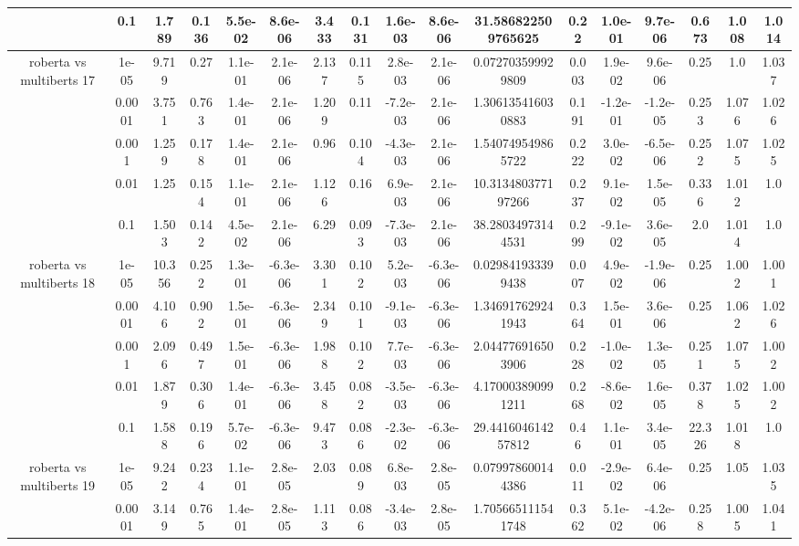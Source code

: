 \begin{tabular}{|c|c|c|c|c|c|c|c|c|c|c|c|c|c|c|c|c|}
 & 0.1 & 1.789 & 0.136 & 5.5e-02 & 8.6e-06 & 3.433 & 0.131 & 1.6e-03 & 8.6e-06 & 31.586822509765625 & 0.22 & 1.0e-01 & 9.7e-06 & 0.673 & 1.008 & 1.014 \\
\hline
\multirow{5}{*}{roberta  vs multiberts 17} & 1e-05 & 9.719 & 0.27 & 1.1e-01 & 2.1e-06 & 2.137 & 0.115 & 2.8e-03 & 2.1e-06 & 0.072703599929809 & 0.003 & 1.9e-02 & 9.6e-06 & 0.25 & 1.0 & 1.037 \\
 & 0.0001 & 3.751 & 0.763 & 1.4e-01 & 2.1e-06 & 1.209 & 0.11 & -7.2e-03 & 2.1e-06 & 1.306135416030883 & 0.191 & -1.2e-01 & -1.2e-05 & 0.253 & 1.076 & 1.026 \\
 & 0.001 & 1.259 & 0.178 & 1.4e-01 & 2.1e-06 & 0.96 & 0.104 & -4.3e-03 & 2.1e-06 & 1.540749549865722 & 0.222 & 3.0e-02 & -6.5e-06 & 0.252 & 1.075 & 1.025 \\
 & 0.01 & 1.25 & 0.154 & 1.1e-01 & 2.1e-06 & 1.126 & 0.16 & 6.9e-03 & 2.1e-06 & 10.313480377197266 & 0.237 & 9.1e-02 & 1.5e-05 & 0.336 & 1.012 & 1.0 \\
 & 0.1 & 1.503 & 0.142 & 4.5e-02 & 2.1e-06 & 6.29 & 0.093 & -7.3e-03 & 2.1e-06 & 38.28034973144531 & 0.299 & -9.1e-02 & 3.6e-05 & 2.0 & 1.014 & 1.0 \\
\hline
\multirow{5}{*}{roberta  vs multiberts 18} & 1e-05 & 10.356 & 0.252 & 1.3e-01 & -6.3e-06 & 3.301 & 0.102 & 5.2e-03 & -6.3e-06 & 0.029841933399438 & 0.007 & 4.9e-02 & -1.9e-06 & 0.25 & 1.002 & 1.001 \\
 & 0.0001 & 4.106 & 0.902 & 1.5e-01 & -6.3e-06 & 2.349 & 0.101 & -9.1e-03 & -6.3e-06 & 1.346917629241943 & 0.364 & 1.5e-01 & 3.6e-06 & 0.25 & 1.062 & 1.026 \\
 & 0.001 & 2.096 & 0.497 & 1.5e-01 & -6.3e-06 & 1.988 & 0.102 & 7.7e-03 & -6.3e-06 & 2.044776916503906 & 0.228 & -1.0e-02 & 1.3e-05 & 0.251 & 1.075 & 1.002 \\
 & 0.01 & 1.879 & 0.306 & 1.4e-01 & -6.3e-06 & 3.458 & 0.082 & -3.5e-03 & -6.3e-06 & 4.170003890991211 & 0.268 & -8.6e-02 & 1.6e-05 & 0.378 & 1.025 & 1.002 \\
 & 0.1 & 1.588 & 0.196 & 5.7e-02 & -6.3e-06 & 9.473 & 0.086 & -2.3e-02 & -6.3e-06 & 29.441604614257812 & 0.46 & 1.1e-01 & 3.4e-05 & 22.326 & 1.018 & 1.0 \\
\hline
\multirow{5}{*}{roberta  vs multiberts 19} & 1e-05 & 9.242 & 0.234 & 1.1e-01 & 2.8e-05 & 2.03 & 0.089 & 6.8e-03 & 2.8e-05 & 0.079978600144386 & 0.011 & -2.9e-02 & 6.4e-06 & 0.25 & 1.05 & 1.035 \\
 & 0.0001 & 3.149 & 0.765 & 1.4e-01 & 2.8e-05 & 1.113 & 0.086 & -3.4e-03 & 2.8e-05 & 1.705665111541748 & 0.362 & 5.1e-02 & -4.2e-06 & 0.258 & 1.005 & 1.041 \\

\end{tabular}
